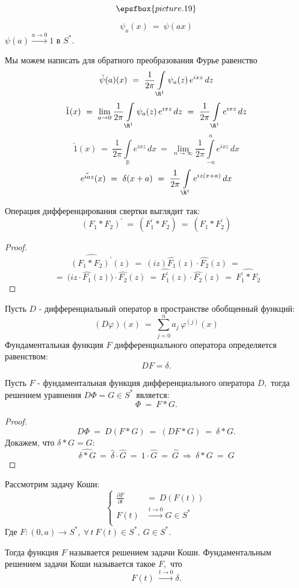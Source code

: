 \documentclass[a4paper]{article}
\newcommand{\nsb}{n\rightarrow \infty} %
\newcommand{\lin} {\lim \limits_{\nsb} }
\newcommand{\asn} {a\rightarrow 0}
\newcommand{\ff} {\varphi}
\newcommand{\mro} {\R^1}
\newcommand{\inr} {\int \limits_{\mathbb R}}
\newcommand{\il} {\int\limits_}
\newcommand{\w}{\widehat}
\begin{document}
$$\epsfbox{picture.19}$$

$$\psi_a (x)\ = \ \psi (ax)$$
$\psi(a)  \stackrel{\asn}{\rightarrow} 1 \mbox{ в }  S^{*}.$

Мы можем написать для обратного преобразования Фурье равенство
$$
\check{\psi} (a) (x)\ = \ \frac{1}{2 \pi} \il{\mro} \psi_a (z) \,
e^{ixz} \, dz
$$
$$
\check{1}(x)\ = \ \lim\limits_{\asn} \frac{1}{2 \pi} \il{\mro}
\psi_a (z) \, e^{ixz} \, dz\ = \ \frac{1}{2 \pi} \il{\mro} e^{ixz}
\, dz
$$
$$
\check{1}(x)\ = \ \frac{1}{2 \pi} \inr e^{ixz} \, dx\ = \ \lin
\frac{1}{2 \pi} \int\limits^{n}_{-n} e^{ixz} \, dx
$$
$$
\check{e^{iaz}}(x)\ = \ \delta (x+a)\ = \ \frac{1}{2 \pi}
\il{\mro} e^{iz(x+a)} \, dx
$$
\begin{stm}
Операция дифференцирования свертки выглядит так:
$$
(F_1 * F_2)^{\prime} \ = \ (F_1^{\prime} * F_2)\ = \ (F_1 *
F_2^{\prime})
$$
\end{stm}

\begin{proof}
$$\w{(F_1 * F_2)^{\prime}} (z)\ = \ (iz) \w{F_1} (z) \cdot \w{F_2}(z)\ = \ $$
$$
\ = \ \bigl(iz \cdot \w{F_1}(z)\bigr) \cdot \w{F_2} (z)\ = \
\w{F_1^{\prime}}(z) \cdot \w{F_2}(z)\ = \ \w{F_1^{\prime}
* F_2}
$$
\end{proof}

Пусть $D$ - дифференциальный оператор  в пространстве обобщенный
функций:
$$
(D\ff)(x)\ = \ \sum\limits_{j=0}^{n} a_j \, \ff^{(j)}(x)
$$
Фундаментальная функция $F$ дифференциального оператора
определяется равенством: $$DF = \delta.$$

\begin{theorem} Пусть $F$ - фундаментальная функция
дифференциального оператора $D,$ тогда решением уравнения $D \Phi
= G \in S^{*}$ является:
$$\Phi \ = \ F*G.$$
\end{theorem}

\begin{proof}
$$D\Phi \ = \ D(F*G)\ = \ (DF * G) \ = \ \delta * G.$$
Докажем, что $\delta * G = G:$
$$
\w{\delta * G}\ = \ \w{\delta} \cdot \w{G}\ = \ 1 \cdot \w{G}\  =
\ \w{G}\ \Rightarrow \ \delta * G \ = \ G
$$
\end{proof}

\begin{df}
Рассмотрим задачу Коши:
$$
\left\{
\begin{aligned}
\frac{\partial F}{\partial t} \ &= \ D(F(t))\\
F (t) &\stackrel{t \rightarrow 0}{\rightarrow} G \in S^{*}\\
\end{aligned}
\right.
$$
Где $F\colon (0, a) \rightarrow S^{*}, \ \forall\, t \  F(t)\in
S^{*}, \ G\in S^{*}.$

Тогда функция $F$ называется решением задачи Коши. Фундаментальным
решением задачи Коши называется такое $F,$ что
$$
F(t) \ \stackrel{t\rightarrow 0}\longrightarrow \delta.
$$
\end{df}
\end{document}
